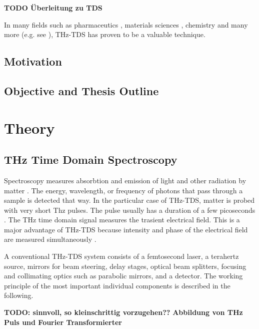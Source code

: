 \documentclass[
	german,%
	accentcolor=9c,%
	ruledheaders=section,%
	class=report,%
	thesis={type=bachelor},%
	fontsize=11pt,%
	parskip=half-,%
	custommargins=false,%
	marginpar=false,%
	BCOR=5mm,%
 	logofile=tools/logo-installation/TUDa-logos/tuda_logo.png,%
]{tudapub}
\begin{document}
\textbf{TODO Überleitung zu TDS}


In many fields such as pharmaceutics \cite{huangProgressApplicationTerahertz2023}, materials sciences \cite{zhangApplicationTHzTDSCharacterization2024}, chemistry \cite{fischerChemicalRecognitionTerahertz2005} and many more (e.g. see \cite{petrovMobileNearfieldTerahertz2023, markelzPerspectiveTerahertzApplications2022,TerahertzSpectroscopyIts2011,kleine-ostmannReviewTerahertzCommunications2011}), THz-TDS has proven to be a valuable technique. 

\section{Motivation}

\section{Objective and Thesis Outline}

\chapter{Theory}

\section{THz Time Domain Spectroscopy}
Spectroscopy measures absorbtion and emission of light and other radiation by matter \cite{atascientificUnderstandingSpectrometrySpectroscopy2020}. The energy, wavelength, or frequency of photons that pass through a sample is detected that way. In the particular case of THz-TDS, matter is probed with very short Thz pulses.
The pulse usually has a duration of a few picoseconds \cite{neuTutorialIntroductionTerahertz2018}. The THz time domain signal measures the trasient electrical field. This is a major advantage of THz-TDS because intensity and phase of the electrical field are measured simultaneously \cite{zhaoPrincipleTerahertzTimeDomain2023}.

A conventional THz-TDS system consists of a femtosecond laser, a terahertz source, mirrors for beam steering, delay stages, optical beam splitters, focusing and collimating optics such as parabolic mirrors, and a detector. The working principle of the most important individual components is described in the following. 

\textbf{TODO: sinnvoll, so kleinschrittig vorzugehen??}
\textbf{Abbildung von THz Puls und Fourier Transformierter}
\end{document}
